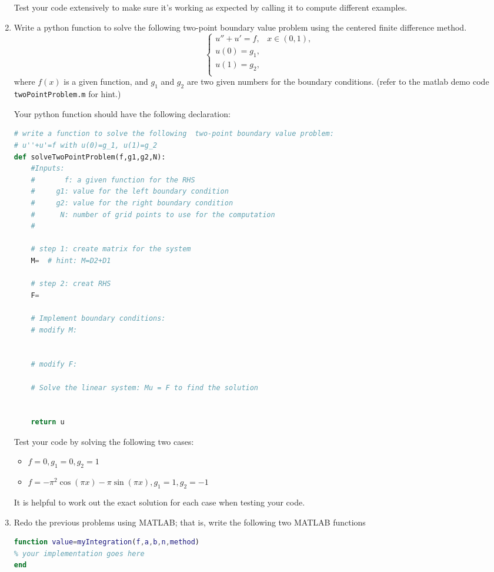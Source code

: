 \documentclass[11pt]{article}
\begin{document}
\begin{enumerate}
Test your code extensively to make sure it's working as expected by calling it to compute different examples.


\item  Write a python function to solve the following two-point boundary value problem using the centered finite difference method.  
$$ 
  \begin{cases}
    u''+u'=f,  & x\in(0,1),\\
    u(0)=g_1,\\
    u(1)=g_2,\\
    \end{cases}
  $$
  where $f(x)$ is a given function, and $g_1$ and  $g_2$ are two given numbers for the boundary conditions. (refer to the matlab demo code \texttt{twoPointProblem.m} for hint.)

Your python function should have the following declaration:
\begin{lstlisting}[language=python, caption={solveTwoPointProblem},label=code:myCode]
# write a function to solve the following  two-point boundary value problem:
# u''+u'=f with u(0)=g_1, u(1)=g_2
def solveTwoPointProblem(f,g1,g2,N):
    #Inputs:
    #       f: a given function for the RHS
    #     g1: value for the left boundary condition
    #     g2: value for the right boundary condition
    #      N: number of grid points to use for the computation
    #

    # step 1: create matrix for the system
    M=  # hint: M=D2+D1

    # step 2: creat RHS
    F=

    # Implement boundary conditions:
    # modify M:


    # modify F:

    # Solve the linear system: Mu = F to find the solution
    

    return u
\end{lstlisting}


Test your code by solving the following two cases:
\begin{itemize}
\item  $f=0, g_1=0, g_2=1$
\item $f=-\pi^2\cos(\pi x)-\pi\sin(\pi x), g_1=1, g_2=-1$  
\end{itemize}  
It is helpful to work out the exact solution for each case when testing your code.


\item Redo the previous problems using MATLAB; that is, write the following two MATLAB functions
\begin{lstlisting}[language=matlab, caption={matlab function for problem 1},label=code:myCode]
function value=myIntegration(f,a,b,n,method)
% your implementation goes here      
end
\end{lstlisting}



\end{enumerate}
\end{document}
